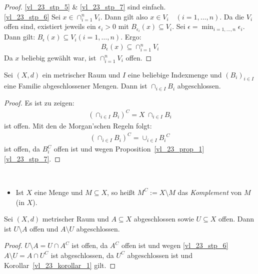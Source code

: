 \begin{proof}
\ref{vl_23_stp_5} \& \ref{vl_23_stp_7} sind einfach. \\
\ref{vl_23_stp_6} Sei $x \in \cap_{i=1}^n V_i$. Dann gilt also $x \in V_i \quad (
	i = 1, \hdots, n)$. Da die $V_i$ offen sind, existiert jeweils ein $\epsilon_i 
	> 0$ mit $B_{\epsilon_i} (x) \subseteq V_i$. 
	Sei $\epsilon = \min_{i = 1, \hdots, n} \epsilon_i$. Dann gilt: 
	$B_\epsilon(x) \subseteq V_i (i = 1, \hdots, n)$. Ergo:
	\begin{align*}
		B_\epsilon(x) \subseteq \cap_{i = 1}^n V_i
	\end{align*}
	Da $x$ beliebig gewählt war, ist $\cap_{i = 1}^n V_i$ offen.
\end{proof}

\begin{Korollar}{\label{vl_23_korollar_1}%
	Sei $(X,d)$ ein metrischer Raum und $I$ eine beliebige Indexmenge und $(B_i)_{
	i \in I}$ eine Familie abgeschlossener Mengen. Dann ist $\cap_{i \in I} B_i$ 
	abgeschlossen.
}\end{Korollar}

\begin{proof}
	Es ist zu zeigen: 
	\begin{align*}
		\left( \cap_{i \in I} B_i \right)^C = X \ \cap_{i \in I}B_i
	\end{align*}
	ist offen. Mit den de Morgan'schen Regeln folgt:
	\begin{align*}
		\left( \cap_{i \in I} B_i \right)^C = \cup_{i \in I}{B_i}^C
	\end{align*}
	ist offen, da $B_i^C$ offen ist und wegen Proposition~\ref{vl_23_prop_1}~	
	\ref{vl_23_stp_7}.
\end{proof}

\begin{Bemerkung}{
	~\begin{itemize}
		\item Ist $X$ eine Menge und $M \subseteq X$, so heißt 
		$M^C := X \setminus M$ das \emph{Komplement} von $M$ (in $X$).
	\end{itemize}
}\end{Bemerkung}

\begin{Korollar}{%
	Sei $(X,d)$ metrischer Raum und $A \subseteq X$ abgeschlossen sowie $U 
	\subseteq X$ offen. Dann ist $U \setminus A$ offen und $A \setminus U$ abgeschlossen.
}\end{Korollar}

\begin{proof}
	$U \setminus A = U \cap A^C$ ist offen, da $A^C$ offen ist und wegen \ref{vl_23_stp_6}
	$A \setminus U = A \cap U^C$ ist abgeschlossen, da $U^C$ abgeschlossen ist und 
	Korollar~\ref{vl_23_korollar_1} gilt.
\end{proof}

